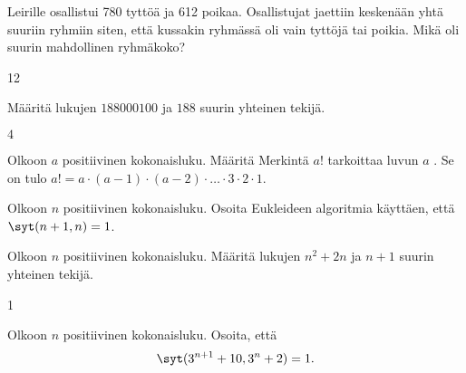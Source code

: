 \begin{tehtavasivu}
\begin{tehtava}
    Leirille osallistui 780 tyttöä ja 612 poikaa. Osallistujat jaettiin keskenään yhtä suuriin ryhmiin siten, että kussakin ryhmässä oli vain tyttöjä tai poikia. Mikä oli suurin mahdollinen ryhmäkoko?
    
    \begin{vastaus}
        12
    \end{vastaus}
    
\end{tehtava}

\begin{tehtava}
    Määritä lukujen $188000100$ ja $188$ suurin yhteinen tekijä.

    \begin{vastaus}
        $4$
    \end{vastaus}
    
\end{tehtava}

\begin{tehtava}
    Olkoon $a$ positiivinen kokonaisluku. Määritä
    Merkintä $a!$ tarkoittaa luvun $a$ . Se on tulo $a! = a \cdot (a-1) \cdot (a-2) \cdot \ldots \cdot 3 \cdot 2 \cdot 1$.

    \begin{vastaus}
    \end{vastaus}
    
\end{tehtava}

\begin{tehtava}
    Olkoon $n$ positiivinen kokonaisluku. Osoita Eukleideen algoritmia käyttäen, että $\syt(n+1, n)=1$.
\end{tehtava}

\begin{tehtava}
    Olkoon $n$ positiivinen kokonaisluku. Määritä lukujen $n^2 + 2n$ ja $n + 1$ suurin yhteinen tekijä.
    
    \begin{vastaus}
        1
    \end{vastaus}
    
\end{tehtava}

\begin{tehtava}
    Olkoon $n$ positiivinen kokonaisluku. Osoita, että
    \[\syt(3^{n+1} + 10, 3^n + 2)=1.\]
\end{tehtava}

\end{tehtavasivu}

